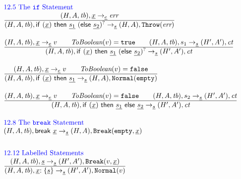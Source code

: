 \documentclass[a4paper, leqno]{amsart}
\newcommand{\rulesep}{\quad\quad}
\newcommand{\stmt}{s}
\newcommand{\expr}{e}
\newcommand{\ir}[1]{\ensuremath{\underline{#1}}}
\newcommand{\irid}{\ir{x}}
\def\inblue{\color{blue}}
\newcommand{\false}{{\tt false}}
\newcommand{\true}{{\tt true}}
\newcommand{\tb}{\emph{tb}}
\newcommand{\err}{\emph{err}}
\newcommand{\ct}{\emph{ct}}
\newcommand{\hf}[1]{\emph{#1}}
\newcommand{\void}{{\tt Normal}({\tt empty})}
\newcommand{\error}{\ensuremath{{\tt Throw}(\err)}}
\newcommand{\state}{\ensuremath{(H,A,\tb)}}
\newcommand{\statel}{\ensuremath{(H,A,\tb)}}
\newcommand{\res}{\ensuremath{(H,A)}}
\newcommand{\resp}{\ensuremath{(H',A')}}
\newcommand{\evale}{\ensuremath{(H,A,\tb)}}
\newcommand{\irif}{\ensuremath{{\sf if} \ {\tt(}\irid{\tt)}\ {\sf then} \ \ir{\stmt_1} \ ({\sf else} \ \ir{\stmt_2})^?}}
\newcommand{\irbreak}{\ensuremath{{\sf break} \ \irid}}
\newcommand{\irlab}{\ensuremath{\ir{x} {\tt: \{} \ir\stmt {\tt\}}}}
\def\inblue{\color{blue}}
\begin{document}
\[
\begin{array}{l@{~~}l@{~~}ll}
\mbox{\inblue 12.5 The {\tt if} Statement}\\
\frac{\begin{matrix}
\evale, \irid \rightarrow_{\ir\expr} \err
\end{matrix}}{\begin{matrix}
\state, \irif \rightarrow_{\ir\stmt} \res, \error
\end{matrix}}
\\[2em]

\frac{\begin{matrix}
\evale, \irid \rightarrow_{\ir\expr} v
\rulesep
\hf{ToBoolean}(v) = \true
\rulesep
\statel, \stmt_1 \rightarrow_{\ir\stmt} \resp, \ct
\end{matrix}}{\begin{matrix}
\state, \irif \rightarrow_{\ir\stmt} \resp, \ct
\end{matrix}}
\\[2em]

\frac{\begin{matrix}
\evale, \irid \rightarrow_{\ir\expr} v
\rulesep
\hf{ToBoolean}(v) = \false
\end{matrix}}{\begin{matrix}
\state, {\sf if} \ {\tt(}\irid{\tt)}\ {\sf then} \ \ir{\stmt_1} 
\rightarrow_{\ir\stmt} \res, \void
\end{matrix}}
\\[2em]

\frac{\begin{matrix}
\evale, \irid \rightarrow_{\ir\expr} v
\rulesep
\hf{ToBoolean}(v) = \false
\rulesep
\statel, \stmt_2\rightarrow_{\ir\stmt} \resp, \ct
\end{matrix}}{\begin{matrix}
\state, {\sf if} \ {\tt(}\irid{\tt)}\ {\sf then} \ \ir{\stmt_1} \ {\sf else} \ \ir{\stmt_2}
\rightarrow_{\ir\stmt} \resp, \ct
\end{matrix}}
\\[2em]


\mbox{\inblue 12.8 The {\tt break} Statement}\\
\state, \irbreak \rightarrow_{\ir\stmt} \res, {\tt Break}({\tt empty}, \ir{x})
\\[2em]



\mbox{\inblue 12.12 Labelled Statements}\\
\frac{\begin{matrix}
\state, \ir\stmt \rightarrow_{\ir\stmt} \resp, {\tt Break}(v, \ir{x})
\end{matrix}}{\begin{matrix}
\state, \irlab \rightarrow_{\ir\stmt} \resp, {\tt Normal}(v)
\end{matrix}}
\\[2em]


\end{array}\]
\end{document}
